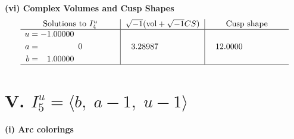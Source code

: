 \documentclass[1p]{elsarticle_modified}
\theoremstyle{definition}
\newcommand{\I}{\sqrt{-1}}
\begin{document}
\newpage\flushleft \textbf{(vi) Complex Volumes and Cusp Shapes}
$$\begin{array}{c|c|c}  
\text{Solutions to }I^u_{4}& \I (\text{vol} + \sqrt{-1}CS) & \text{Cusp shape}\\
 \hline 
\begin{aligned}
u &= -1.00000\phantom{ +0.000000I} \\
a &= \phantom{-0.000000 } 0 \\
b &= \phantom{-}1.00000\phantom{ +0.000000I}\end{aligned}
 & \phantom{-}3.28987\phantom{ +0.000000I} & \phantom{-}12.0000\phantom{ +0.000000I}\\
 \hline 
 \end{array}$$\newpage\newpage\renewcommand{\arraystretch}{1}
\centering \section*{V. $I^u_{5}= \langle b,\;a-1,\;u-1 \rangle$}
\flushleft \textbf{(i) Arc colorings}\\
\end{document}
